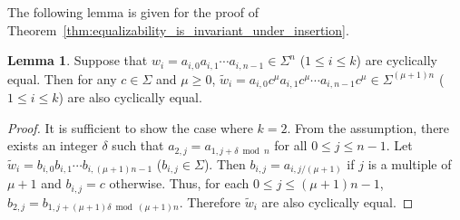 \documentclass{article}
\theoremstyle{definition}
\newtheorem{lemma}[theorem]{Lemma}
\begin{document}
The following lemma is given for the proof of Theorem~\ref{thm:equalizability_is_invariant_under_insertion}.

\begin{lemma}
    \label{lem:inserting_equal_number_of_zeroes}
    Suppose that $w_i = a_{i,0} a_{i,1} \cdots a_{i,n-1} \in \Sigma^n$ ($1 \leq i \leq k$) are cyclically equal. 
    Then for any $c \in \Sigma$ and $\mu \geq 0$, $\widetilde{w}_i = a_{i,0} c^{\mu} a_{i,1} c^{\mu} \cdots a_{i,n-1} c^{\mu} \in \Sigma^{(\mu+1)n}$ ($1 \leq i \leq k$) are also cyclically equal. 
\end{lemma}

\begin{proof}
    It is sufficient to show the case where $k = 2$.
    From the assumption, there exists an integer $\delta$ such that $a_{2,j} = a_{1,j + \delta \bmod n}$ for all $0 \leq j \leq n-1$. 
    Let $\widetilde{w}_i = b_{i,0} b_{i,1} \cdots b_{i, (\mu+1) n - 1}$ ($b_{i,j} \in \Sigma$). 
    Then $b_{i,j} = a_{i,j/(\mu+1)}$ if $j$ is a multiple of $\mu+1$ and $b_{i,j} = c$ otherwise.
    Thus, for each $0 \leq j \leq (\mu+1) n - 1$, $b_{2,j} = b_{1,j + (\mu+1) \delta \bmod (\mu+1)n}$.
    Therefore $\widetilde{w}_i$ are also cyclically equal.
\end{proof}
\end{document}
